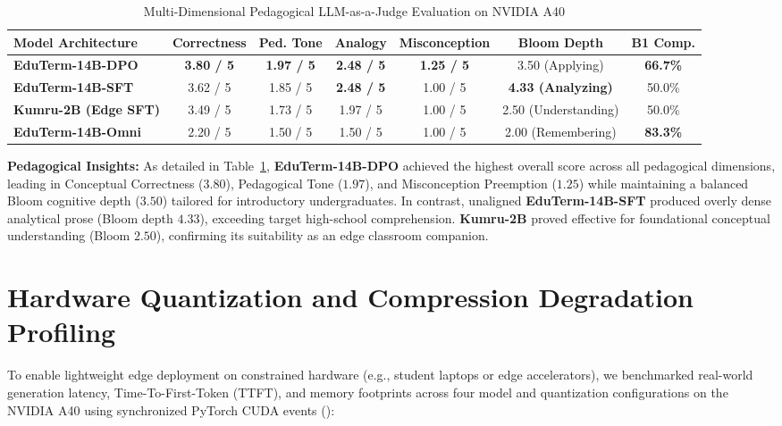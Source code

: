 \documentclass[a4paper,12pt]{report}
\begin{document}
\begin{table}[htbp]
\centering
\small
\caption{Multi-Dimensional Pedagogical LLM-as-a-Judge Evaluation on NVIDIA A40}
\label{tab:bloom_taxonomy_benchmark}
\scriptsize\setlength{\tabcolsep}{1.5pt}
\begin{tabularx}{\textwidth}{>{\RaggedRight\arraybackslash}Xcccccc}
\hline
\textbf{Model Architecture} & \textbf{Correctness} & \textbf{Ped. Tone} & \textbf{Analogy} & \textbf{Misconception} & \textbf{Bloom Depth} & \textbf{B1 Comp.} \\
\hline
\textbf{EduTerm-14B-DPO} & \textbf{3.80 / 5} & \textbf{1.97 / 5} & \textbf{2.48 / 5} & \textbf{1.25 / 5} & 3.50 (Applying) & \textbf{66.7\%} \\
\textbf{EduTerm-14B-SFT} & 3.62 / 5 & 1.85 / 5 & \textbf{2.48 / 5} & 1.00 / 5 & \textbf{4.33 (Analyzing)} & 50.0\% \\
\textbf{Kumru-2B (Edge SFT)} & 3.49 / 5 & 1.73 / 5 & 1.97 / 5 & 1.00 / 5 & 2.50 (Understanding) & 50.0\% \\
\textbf{EduTerm-14B-Omni} & 2.20 / 5 & 1.50 / 5 & 1.50 / 5 & 1.00 / 5 & 2.00 (Remembering) & \textbf{83.3\%} \\
\hline
\end{tabularx}
\end{table}

\textbf{Pedagogical Insights:} As detailed in Table~\ref{tab:bloom_taxonomy_benchmark}, \textbf{EduTerm-14B-DPO} achieved the highest overall score across all pedagogical dimensions, leading in Conceptual Correctness ($3.80$), Pedagogical Tone ($1.97$), and Misconception Preemption ($1.25$) while maintaining a balanced Bloom cognitive depth ($3.50$) tailored for introductory undergraduates. In contrast, unaligned \textbf{EduTerm-14B-SFT} produced overly dense analytical prose (Bloom depth $4.33$), exceeding target high-school comprehension. \textbf{Kumru-2B} proved effective for foundational conceptual understanding (Bloom $2.50$), confirming its suitability as an edge classroom companion.


\section{Hardware Quantization and Compression Degradation Profiling}
\label{sec:quantization_benchmark}
To enable lightweight edge deployment on constrained hardware (e.g., student laptops or edge accelerators), we benchmarked real-world generation latency, Time-To-First-Token (TTFT), and memory footprints across four model and quantization configurations on the NVIDIA A40 using synchronized PyTorch CUDA events ():
\end{document}
